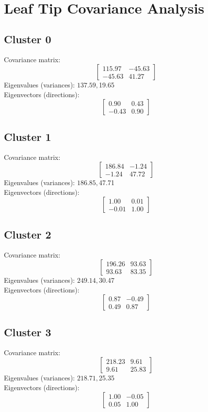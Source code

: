 \documentclass{article}
\begin{document}
\section*{Leaf Tip Covariance Analysis}
\subsection*{Cluster 0}
Covariance matrix:
\[\begin{bmatrix}115.97 & -45.63 \\-45.63 & 41.27\end{bmatrix}\]
Eigenvalues (variances): $ 137.59, $19.65\\
Eigenvectors (directions):
\[\begin{bmatrix}0.90 & 0.43 \\-0.43 & 0.90\end{bmatrix}\]
\subsection*{Cluster 1}
Covariance matrix:
\[\begin{bmatrix}186.84 & -1.24 \\-1.24 & 47.72\end{bmatrix}\]
Eigenvalues (variances): $ 186.85, $47.71\\
Eigenvectors (directions):
\[\begin{bmatrix}1.00 & 0.01 \\-0.01 & 1.00\end{bmatrix}\]
\subsection*{Cluster 2}
Covariance matrix:
\[\begin{bmatrix}196.26 & 93.63 \\93.63 & 83.35\end{bmatrix}\]
Eigenvalues (variances): $ 249.14, $30.47\\
Eigenvectors (directions):
\[\begin{bmatrix}0.87 & -0.49 \\0.49 & 0.87\end{bmatrix}\]
\subsection*{Cluster 3}
Covariance matrix:
\[\begin{bmatrix}218.23 & 9.61 \\9.61 & 25.83\end{bmatrix}\]
Eigenvalues (variances): $ 218.71, $25.35\\
Eigenvectors (directions):
\[\begin{bmatrix}1.00 & -0.05 \\0.05 & 1.00\end{bmatrix}\]
\end{document}
